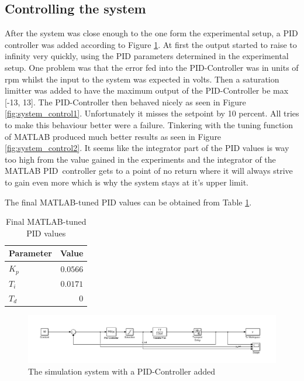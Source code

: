 \subsection{Controlling the system}

After the system was close enough to the one form the experimental setup, a PID controller was added according to Figure \ref{fig:PID_system}. At first the output started to raise to infinity very quickly, using the PID parameters determined in the experimental setup. One problem was that the error fed into the PID-Controller was in units of rpm whilst the input to the system was expected in volts. Then a saturation limitter was added to have the maximum output of the PID-Controller be max [-13, 13]. The PID-Controller then behaved nicely as seen in Figure \ref{fig:system_control1}. Unfortunately it misses the setpoint by 10 percent. All tries to make this behaviour better were a failure. Tinkering with the tuning function of MATLAB produced much better results as seen in Figure \ref{fig:system_control2}. It seems like the integrator part of the PID values is way too high from the value gained in the experiments and the integrator of the MATLAB PID controller gets to a point of no return where it will always strive to gain even more which is why the system stays at it's upper limit.

The final MATLAB-tuned PID values can be obtained from Table \ref{tab:final_values}.

\begin{table}[H]
\begin{center}
\begin{tabular}{ l | r}
  Parameter & Value\\
  \hline
  \hline
  $K_p$ & $0.0566$\\
  \hline
  $T_i$ & $0.0171$\\
  \hline
  $T_d$ & $0$\\
  \hline
\end{tabular}
\end{center}
\caption{Final MATLAB-tuned PID values}
\label{tab:final_values}
\end{table}

\begin{figure}[H]
\begin{center}
\includegraphics[width=1\linewidth]{images/general/PID_system}
\end{center}
\caption{The simulation system with a PID-Controller added}
\label{fig:PID_system}
\end{figure}

